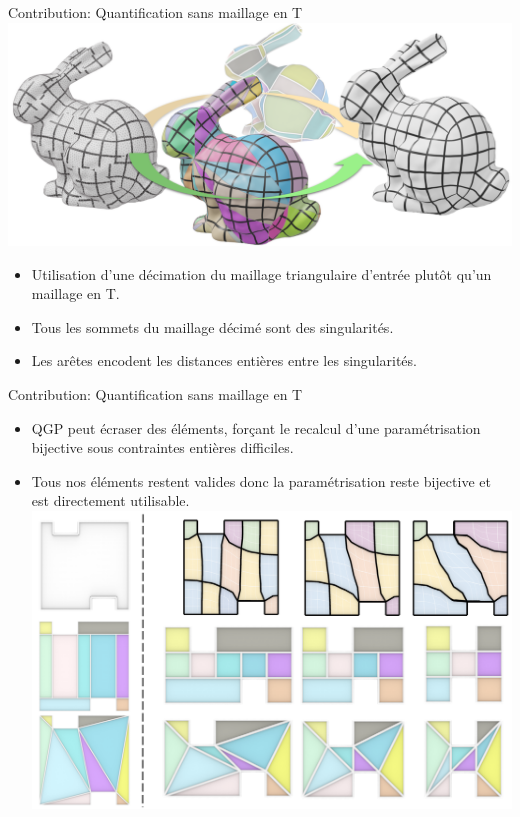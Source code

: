 

\begin{frame}{Contribution: Quantification sans maillage en T}
    \centering
    \includegraphics[width=\linewidth]{yoimg/teaser.PNG}
	\vspace{-1.5em}
	\begin{itemize}
		\item Utilisation d'une décimation du maillage triangulaire d'entrée plutôt qu'un maillage en T.
		\item Tous les sommets du maillage décimé sont des singularités.
		\item Les arêtes encodent les distances entières entre les singularités.
    \end{itemize}
\end{frame}

\begin{frame}{Contribution: Quantification sans maillage en T}
    \begin{itemize}
        \item QGP peut écraser des éléments, forçant le recalcul d'une paramétrisation bijective sous contraintes entières difficiles.\\
        \item Tous nos éléments restent valides donc la paramétrisation reste bijective et est directement utilisable.\\
        \centering
        \includegraphics[width=0.75\linewidth]{yoimg/restriction.png}
    \end{itemize}
\end{frame}


